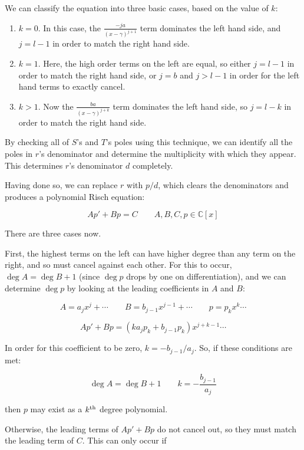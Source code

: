 We can classify the equation into three basic cases, based on the value of $k$:

\begin{enumerate}

\item $k=0$.  In this case, the $\frac{-ja}{(x-\gamma)^{j+1}}$ term dominates the left hand side,
and $j = l-1$ in order to match the right hand side.

\item $k=1$.  Here, the high order terms on the left are equal, so either $j=l-1$ in order to match
the right hand side, or $j=b$ and $j>l-1$ in order for the left hand terms to exactly cancel.

\item $k>1$.  Now the $\frac{ba}{(x-\gamma)^{j+k}}$ term dominates the left hand side, so $j=l-k$ in
order to match the right hand side.

\end{enumerate}

By checking all of $S$'s and $T$'s poles using this technique, we can
identify all the poles in $r$'s denominator and determine the
multiplicity with which they appear.  This determines $r$'s
denominator $d$ completely.

Having done so, we can replace $r$ with $p/d$, which clears the
denominators and produces a polynomial Risch equation:

$$A p' + B p = C \qquad A,B,C,p \in {\mathbb C}[x]$$

There are three cases now.

First, the highest terms on the left can have higher degree than any term on
the right, and so must cancel against each other.  For this to occur,
$\deg A = \deg B + 1$ (since $\deg p$ drops by one on differentiation),
and we can determine $\deg p$ by looking at the leading
coefficients in $A$ and $B$:

$$A = a_j x^j + \cdots \qquad B = b_{j-1} x^{j-1} + \cdots \qquad p = p_k x^k \cdots$$

$$A p' + B p = (k a_j p_k + b_{j-1} p_k) x^{j+k-1} \cdots$$

In order for this coefficient to be zero, $k=-b_{j-1}/a_j$.
So, if these conditions are met:

$$\deg A = \deg B + 1 \qquad k=-\frac{b_{j-1}}{a_j} $$

then $p$ may exist as a $k^{\rm th}$ degree polynomial.

Otherwise, the leading terms of $A p' + B p$ do not cancel out,
so they must match the leading term of $C$.  This can only
occur if

